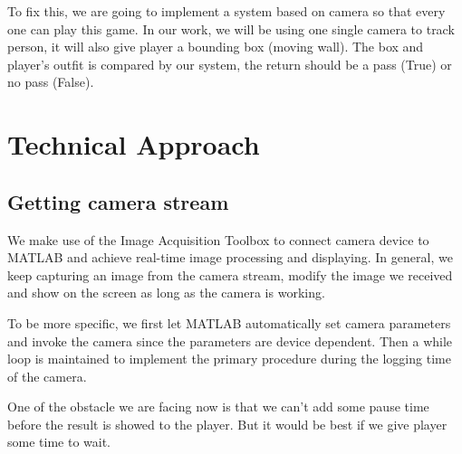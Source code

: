 \documentclass[conference,compsoc]{IEEEtran}
\begin{document}
	\par
		To fix this, we are going to implement a system based on camera so that every one can play this game.
		In our work, we will be using one single camera to track person, it will also give player a bounding box (moving wall).
		The box and player's outfit is compared by our system, the return should be a pass (True) or no pass (False).
\section{Technical Approach}
	\subsection{Getting camera stream}
	\par
	We make use of the Image Acquisition Toolbox to connect camera device to MATLAB and achieve real-time image processing and displaying. In general, we keep capturing an image from the camera stream, modify the image we received and show on the screen as long as the camera is working.
	\par
	To be more specific, we first let MATLAB automatically set camera parameters and invoke the camera since the parameters are device dependent. Then a while loop is maintained to implement the primary procedure during the logging time of the camera.
	\par
	One of the obstacle we are facing now is that we can't add some pause time before the result is showed to the player. But it would be best if we give player some time to wait.
\end{document}

